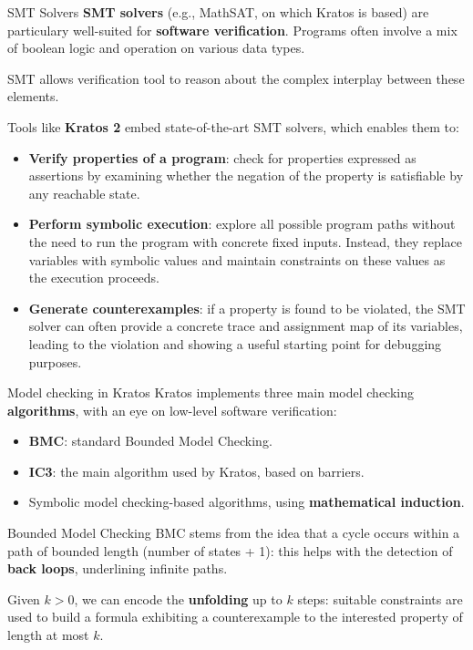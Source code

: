 \documentclass[aspectratio=1610,10.5pt]{beamer} %
\begin{document}
\begin{frame}{SMT Solvers}
    \textbf{SMT solvers} (e.g., MathSAT, on which Kratos is based) are particulary well-suited for \textbf{software verification}. Programs often involve a mix of boolean logic and operation on various data types.

    SMT allows verification tool to reason about the complex interplay between these elements.

    \bigskip

    Tools like \textbf{Kratos 2} embed state-of-the-art SMT solvers, which enables them to:

    \smallskip

    \begin{itemize}
        \item \textbf{Verify properties of a program}: check for properties expressed as assertions by examining whether the negation of the property is satisfiable by any reachable state.
        \item \textbf{Perform symbolic execution}: explore all possible program paths without the need to run the program with concrete fixed inputs.
            Instead, they replace variables with symbolic values and maintain constraints on these values as the execution proceeds.
        \item \textbf{Generate counterexamples}: if a property is found to be violated, the SMT solver can often provide a concrete trace and assignment map of its variables, leading to the violation and showing a useful starting point for debugging purposes.
    \end{itemize}
\end{frame}

\begin{frame}[fragile]{Model checking in Kratos}
    Kratos implements three main model checking \textbf{algorithms}, with an eye on low-level software verification:
    \begin{itemize}
        \item \textbf{BMC}: standard Bounded Model Checking.
        \item \textbf{IC3}: the main algorithm used by Kratos, based on barriers.
        \item Symbolic model checking-based algorithms, using \textbf{mathematical induction}.
    \end{itemize}
    \begin{block}{Bounded Model Checking}
        BMC stems from the idea that a cycle occurs within a path of bounded length (number of states + 1): this helps with the detection of \textbf{back loops}, underlining infinite paths.

        \smallskip

        Given $k > 0$, we can encode the \textbf{unfolding} up to $k$ steps: suitable constraints are used to build a formula exhibiting a counterexample to the interested property of length at most $k$.
    \end{block}
\end{frame}
\end{document}

